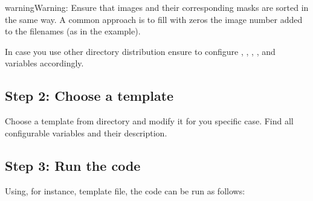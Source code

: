 \documentclass[letterpaper,10pt,english]{sphinxmanual}
\begin{document}
\begin{sphinxadmonition}{warning}{Warning:}
Ensure that images and their corresponding masks are sorted in the same way. A common approach is to fill with zeros the image number added to the filenames (as in the example).
\end{sphinxadmonition}

In case you use other directory distribution ensure to configure , , , ,  and  variables accordingly.


\subsection{Step 2: Choose a template}
\label{\detokenize{how_to_run/bash:step-2-choose-a-template}}
Choose a template from  directory and modify it for you specific case. Find  all configurable variables and their description.


\subsection{Step 3: Run the code}
\label{\detokenize{how_to_run/bash:step-3-run-the-code}}
Using, for instance,  template file, the code can be run as follows:
\end{document}

